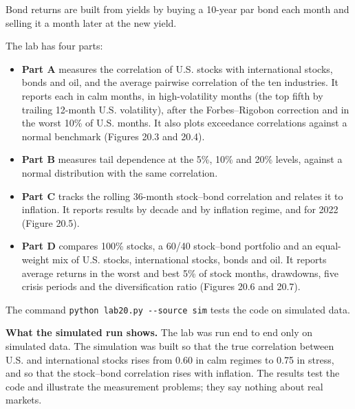 Bond returns are built from yields by buying a 10-year par bond each month and selling it a month later at the new yield.

The lab has four parts:

\begin{itemize}
  \item \textbf{Part A} measures the correlation of U.S. stocks with international stocks, bonds and oil, and the average pairwise correlation of the ten industries. It reports each in calm months, in high-volatility months (the top fifth by trailing 12-month U.S. volatility), after the Forbes--Rigobon correction and in the worst 10\% of U.S. months. It also plots exceedance correlations against a normal benchmark (Figures 20.3 and 20.4).
  \item \textbf{Part B} measures tail dependence at the 5\%, 10\% and 20\% levels, against a normal distribution with the same correlation.
  \item \textbf{Part C} tracks the rolling 36-month stock--bond correlation and relates it to inflation. It reports results by decade and by inflation regime, and for 2022 (Figure 20.5).
  \item \textbf{Part D} compares 100\% stocks, a 60/40 stock--bond portfolio and an equal-weight mix of U.S. stocks, international stocks, bonds and oil. It reports average returns in the worst and best 5\% of stock months, drawdowns, five crisis periods and the diversification ratio (Figures 20.6 and 20.7).
\end{itemize}

The command \texttt{python lab20.py -{}-source sim} tests the code on simulated data.

\textbf{What the simulated run shows.} The lab was run end to end only on simulated data. The simulation was built so that the true correlation between U.S. and international stocks rises from 0.60 in calm regimes to 0.75 in stress, and so that the stock--bond correlation rises with inflation. The results test the code and illustrate the measurement problems; they say nothing about real markets.


